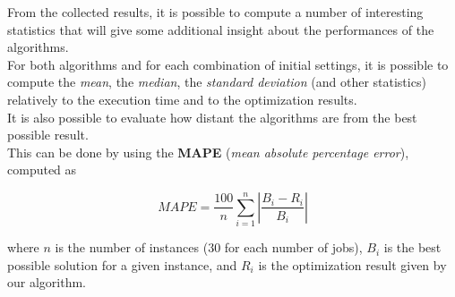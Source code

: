 \documentclass[
12pt,
a4paper,
oneside,
headinclude,
footinclude]{article}
\theoremstyle{definition} %
\begin{document}
From the collected results, it is possible to compute a number of interesting statistics that will give some additional insight about the performances of the algorithms.\\
For both algorithms and for each combination of initial settings, it is possible to compute the \textit{mean}, the \textit{median}, the \textit{standard deviation} (and other statistics) relatively to the execution time and to the optimization results.\\
It is also possible to evaluate how distant the algorithms are from the best possible result.\\
This can be done by using the \textbf{MAPE} (\textit{mean absolute percentage error}), computed as

$$ MAPE = \frac{100}{n}\sum_{i=1}^n{\left|\frac{B_i - R_i}{B_i}\right|}$$

where $n$ is the number of instances ($30$ for each number of jobs), $B_i$ is the best possible solution for a given instance, and $R_i$ is the optimization result given by our algorithm.
\end{document}
